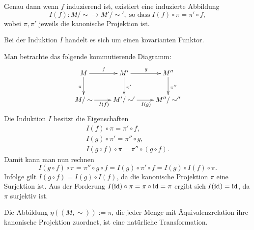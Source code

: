 Genau dann wenn $f$ induzierend ist, existiert eine induzierte
Abbildung
\begin{equation}
I(f)\colon M/\sim\to M'/\sim',\;\text{so dass}\;I(f)\circ\pi = \pi'\circ f,
\end{equation}
wobei $\pi,\pi'$ jeweils die kanonische Projektion ist.
\begin{Satz}
Bei der Induktion $I$ handelt es sich um einen kovarianten
Funktor.
\end{Satz}
 Man betrachte das folgende kommutierende Diagramm:
\[\xymatrix{
M \ar[r]^{f} \ar[d]_{\pi}
& M' \ar[r]^{g} \ar[d]^{\pi'}
& M'' \ar[d]^{\pi''}\\
M/\sim \ar[r]_{I(f)}
& M'/\sim' \ar[r]_{I(g)}
& M''/\sim''}\]
Die Induktion $I$ besitzt die Eigenschaften
\begin{gather}
I(f)\circ\pi = \pi'\circ f,\\
I(g)\circ\pi' = \pi''\circ g,\\
I(g\circ f)\circ\pi = \pi''\circ (g\circ f).
\end{gather}
Damit kann man nun rechnen
\begin{equation}
I(g\circ f)\circ\pi = \pi''\circ g\circ f
= I(g)\circ\pi'\circ f = I(g)\circ I(f)\circ\pi.
\end{equation}
Infolge gilt $I(g\circ f)=I(g)\circ I(f)$, da die kanonische
Projektion $\pi$ eine Surjektion ist. Aus der Forderung $I(\operatorname{id})\circ\pi
= \pi\circ\operatorname{id} = \pi$ ergibt sich $I(\operatorname{id}) = \operatorname{id}$,
da $\pi$ surjektiv ist.\;\qedsymbol

Die Abbildung $\eta((M,\sim)):=\pi$, die jeder Menge mit
Äquivalenzrelation ihre kanonische Projektion zuordnet,
ist eine natürliche Transformation.

